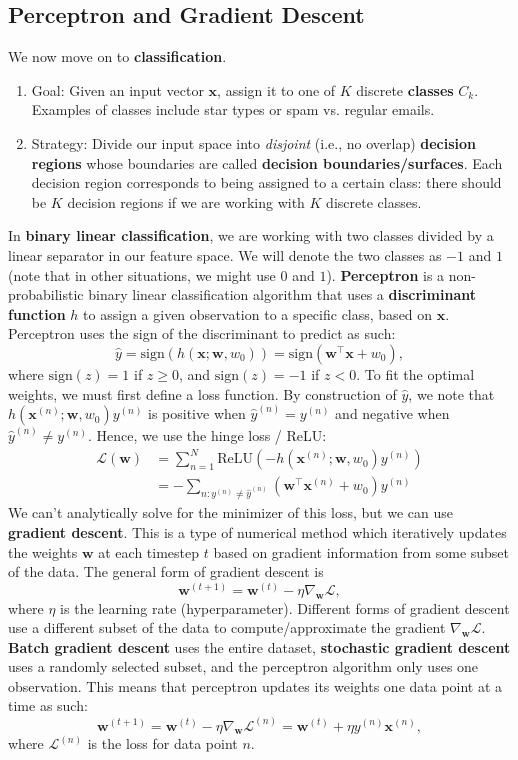 \documentclass[11pt, letterpaper]{article}
\theoremstyle{definition}
\theoremstyle{plain}
\begin{document}
\subsection{Perceptron and Gradient Descent}

 We now move on to \textbf{classification}.
\begin{enumerate}
    \item Goal: Given an input vector $\bm x$, assign it to one of $K$ discrete \textbf{classes} $C_k$. Examples of classes include star types or spam vs. regular emails.
    \item Strategy: Divide our input space into \emph{disjoint} (i.e., no overlap) \textbf{decision regions} whose boundaries are called \textbf{decision boundaries/surfaces}. Each decision region corresponds to being assigned to a certain class: there should be $K$ decision regions if we are working with $K$ discrete classes.
\end{enumerate}

In \textbf{binary linear classification}, we are working with two classes divided by a linear separator in our feature space. We will denote the two classes as $-1$ and $1$ (note that in other situations, we might use $0$ and $1$). \textbf{Perceptron} is a non-probabilistic binary linear classification algorithm that uses a \textbf{discriminant function} $h$ to assign a given observation to a specific class, based on $\bm x$. Perceptron uses the sign of the discriminant to predict as such:
\[\hat{y} = \text{sign}(h(\bm x; \bm w, w_0)) = \text{sign}(\bm{w}^\top\bm{x} + w_0),\]
where $\text{sign}(z) = 1$ if $z \geq 0$, and $\text{sign}(z) = -1$ if $z < 0$.  To fit the optimal weights, we must first define a loss function. By construction of $\hat y$, we note that $h(\bm{x}^{(n)};\bm{w},w_0) y^{(n)}$ is positive when $\hat{y}^{(n)} = y^{(n)}$ and negative when $\hat{y}^{(n)} \ne y^{(n)}$. Hence, we use the hinge loss / ReLU:
\begin{align*}
   \mathcal{L}(\bm{w}) &=  \sum_{n=1}^N \text{ReLU}(-h(\bm{x}^{(n)};\bm{w},w_0) y^{(n)})  \\
    &=  -\sum_{n: y^{(n)} \neq \hat{y}^{(n)}} (\bm{w}^\top\bm{x}^{(n)} + w_0) y^{(n)}
\end{align*}
We can't analytically solve for the minimizer of this loss, but we can use \textbf{gradient descent}. This is a type of numerical method which iteratively updates the weights $\bm{w}$ at each timestep $t$ based on gradient information from some subset of the data. The general form of gradient descent is 
\[\bm{w}^{(t+1)} = \bm{w}^{(t)} - \eta \nabla_{\bm w}\mathcal{L},\]
where $\eta$ is the learning rate (hyperparameter). Different forms of gradient descent use a different subset of the data to compute/approximate the gradient $\nabla_{\bm w}\mathcal{L}$. \textbf{Batch gradient descent} uses the entire dataset, \textbf{stochastic gradient descent} uses a randomly selected subset, and the perceptron algorithm only uses one observation. This means that perceptron updates its weights one data point at a time as such:
\[
    \bm{w}^{(t+1)} = \bm{w}^{(t)} - \eta \nabla_{\bm w}\mathcal{L}^{(n)} = \bm{w}^{(t)} + \eta y^{(n)}\bm{x}^{(n)},
\]
where $\mathcal{L}^{(n)}$ is the loss for data point $n$. 
\end{document}
